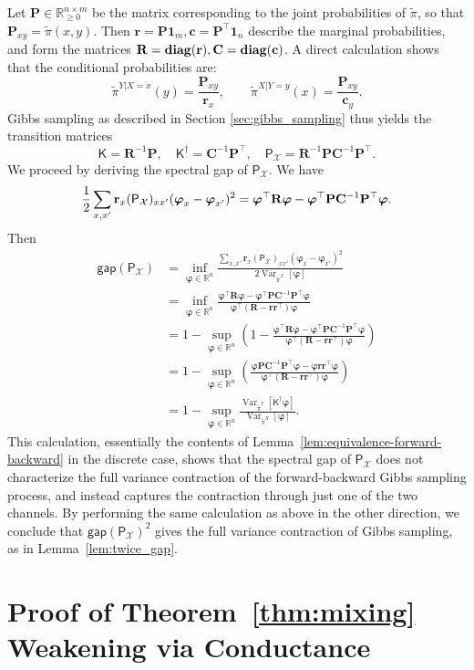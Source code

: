 \documentclass[11pt]{article}
\newcommand{\R}{\mathbb{R}}
\newcommand{\diag}[1]{\textbf{\textup{diag}}{\left(#1\right)}}
\newcommand{\Par}[1]{\left(#1\right)}
\newcommand{\mc}{\mathbf{C}}
\newcommand{\mpp}{\mathbf{P}}
\newcommand{\mr}{\mathbf{R}}
\newcommand{\0}{\mathbf{0}}
\newcommand{\1}{\mathbf{1}}
\newcommand{\vc}{\mathbf{c}}
\newcommand{\vr}{\mathbf{r}}
\newcommand{\calX}{\mathcal{X}}
\newcommand{\sfK}{\mathsf{K}}
\newcommand{\sfP}{\mathsf{P}}
\newcommand{\vhi}{\varphi}
\newcommand{\vvhi}{\boldsymbol{\vhi}}
\newcommand{\tpi}{\tilde{\pi}}
\newcommand{\gap}{\mathsf{gap}}
\begin{document}
Let $\mpp\in\R_{\ge0}^{n\times m}$ be the matrix corresponding to the joint probabilities of $\tpi$, so that $\mpp_{xy}=\tpi(x, y)$. Then $\vr = \mpp\mathbf{1}_m, \vc = \mpp^\top \mathbf{1}_n$ describe the marginal probabilities, and form the matrices $\mr = \diag{\vr}, \mc = \diag{\vc}$. A direct calculation shows that the conditional probabilities are: \[
\tpi^{Y|X=x}(y) = \frac{\mpp_{xy}}{\vr_x},\qquad \tpi^{X|Y=y}(x) = \frac{\mpp_{xy}}{\vc_y}.
\]
Gibbs sampling as described in Section \ref{sec:gibbs_sampling} thus yields the transition matrices
\[
\sfK=\mr^{-1}\mpp, \quad \sfK^\dagger = \mc^{-1}\mpp^\top, \quad \sfP_{\calX}=\mr^{-1}\mpp\mc^{-1}\mpp^\top.
\]
We proceed by deriving the spectral gap of $\sfP_\calX$.  We have
\[
    \frac{1}{2}\sum_{x,x'}\vr_x(\sfP_\calX)_{xx'}(\vvhi_x-\vvhi_{x'})^2\\
    =\vvhi^\top \mathbf{R}\vvhi-\vvhi^\top \mpp \mc^{-1}\mpp^\top \vvhi.
\]
Then
\begin{align*}
    \gap(\sfP_\calX)
    &=\inf_{\vvhi\in \mathbb{R}^n}\frac{\sum_{x,x'}\vr_x(\sfP_\calX)_{xx'}(\vvhi_x-\vvhi_{x'})^2}{2\operatorname{Var}_{\tpi^\calX}[\vvhi]}\\
    &=\inf_{\vvhi\in \mathbb{R}^n}\frac{\vvhi^\top \mathbf{R}\vvhi-\vvhi^\top \mpp \mc^{-1}\mpp^\top \vvhi}{\vvhi^\top (\mr-\vr\vr^\top)\vvhi}\\
    &= 1 - \sup_{\vvhi\in \mathbb{R}^n}\Par{1-\frac{\vvhi^\top \mathbf{R}\vvhi-\vvhi^\top \mpp \mc^{-1}\mpp^\top \vvhi}{\vvhi^\top (\mr-\vr\vr^\top)\vvhi}}\\
    &=1 - \sup_{\vvhi\in \mathbb{R}^n}\Par{\frac{ \vvhi\mpp \mc^{-1}\mpp^\top \vvhi-\vvhi \vr\vr^\top\vvhi}{\vvhi^\top (\mr-\vr\vr^\top)\vvhi}}\\
    &=1-\sup_{\vvhi\in \mathbb{R}^n} \frac{\operatorname{Var}_{\tpi^Y}[\sfK^\dagger \vvhi]}{\operatorname{Var}_{\tpi^X}[\vvhi]}.
\end{align*}
This calculation, essentially the contents of Lemma~\ref{lem:equivalence-forward-backward} in the discrete case, shows that the spectral gap of $\sfP_{\calX}$ does not characterize the full variance contraction of the forward-backward Gibbs sampling process, and instead captures the contraction through just one of the two channels. By performing the same calculation as above in the other direction, we conclude that $\gap(\sfP_{\calX})^2$ gives the full variance contraction of Gibbs sampling, as in Lemma~\ref{lem:twice_gap}.


\section{Proof of Theorem~\ref{thm:mixing} Weakening via Conductance}\label{app:proof_via_conductance}
\end{document}
